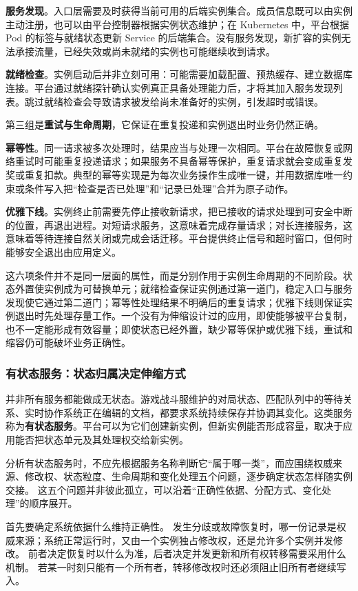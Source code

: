 \textbf{服务发现}。入口层需要及时获得当前可用的后端实例集合。成员信息既可以由实例主动注册，也可以由平台控制器根据实例状态维护；在 Kubernetes 中，平台根据 Pod 的标签与就绪状态更新 Service 的后端集合。没有服务发现，新扩容的实例无法承接流量，已经失效或尚未就绪的实例也可能继续收到请求。

\textbf{就绪检查}。实例启动后并非立刻可用：可能需要加载配置、预热缓存、建立数据库连接。平台通过就绪探针确认实例真正具备处理能力后，才将其加入服务发现列表。跳过就绪检查会导致请求被发给尚未准备好的实例，引发超时或错误。

第三组是\textbf{重试与生命周期}，它保证在重复投递和实例退出时业务仍然正确。

\textbf{幂等性}。同一请求被多次处理时，结果应当与处理一次相同。平台在故障恢复或网络重试时可能重复投递请求；如果服务不具备幂等保护，重复请求就会变成重复发奖或重复扣款。典型的幂等实现是为每次业务操作生成唯一键，并用数据库唯一约束或条件写入把“检查是否已处理”和“记录已处理”合并为原子动作。

\textbf{优雅下线}。实例终止前需要先停止接收新请求，把已接收的请求处理到可安全中断的位置，再退出进程。对短请求服务，这意味着完成存量请求；对长连接服务，这意味着等待连接自然关闭或完成会话迁移。平台提供终止信号和超时窗口，但何时能够安全退出由应用定义。

这六项条件并不是同一层面的属性，而是分别作用于实例生命周期的不同阶段。状态外置使实例成为可替换单元；就绪检查保证实例通过第一道门，稳定入口与服务发现使它通过第二道门；幂等性处理结果不明确后的重复请求；优雅下线则保证实例退出时先处理存量工作。一个没有为伸缩设计过的应用，即使能够被平台复制，也不一定能形成有效容量；即使状态已经外置，缺少幂等保护或优雅下线，重试和缩容仍可能破坏业务正确性。

\subsubsection{有状态服务：状态归属决定伸缩方式}
\label{sec6:stateful-scaling}

并非所有服务都能做成无状态。游戏战斗服维护的对局状态、匹配队列中的等待关系、实时协作系统正在编辑的文档，都要求系统持续保存并协调其变化。这类服务称为\textbf{有状态服务}。平台可以为它们创建新实例，但新实例能否形成容量，取决于应用能否把状态单元及其处理权交给新实例。

分析有状态服务时，不应先根据服务名称判断它“属于哪一类”，而应围绕权威来源、修改权、状态粒度、生命周期和变化处理五个问题，逐步确定状态怎样随实例交接。
这五个问题并非彼此孤立，可以沿着“正确性依据、分配方式、变化处理”的顺序展开。

首先要确定系统依据什么维持正确性。
发生分歧或故障恢复时，哪一份记录是权威来源；系统正常运行时，又由一个实例独占修改权，还是允许多个实例并发修改。
前者决定恢复时以什么为准，后者决定并发更新和所有权转移需要采用什么机制。
若某一时刻只能有一个所有者，转移修改权时还必须阻止旧所有者继续写入。


